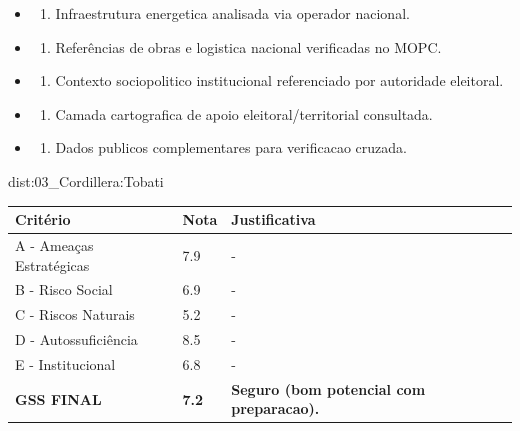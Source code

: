 {\begin{itemize}
\item
  \begin{enumerate}
  \def\labelenumi{\arabic{enumi})}
  \setcounter{enumi}{7}
  \tightlist
  \item
    Infraestrutura energetica analisada via operador nacional.
  \end{enumerate}
\item
  \begin{enumerate}
  \def\labelenumi{\arabic{enumi})}
  \setcounter{enumi}{8}
  \tightlist
  \item
    Referências de obras e logistica nacional verificadas no MOPC.
  \end{enumerate}
\item
  \begin{enumerate}
  \def\labelenumi{\arabic{enumi})}
  \setcounter{enumi}{9}
  \tightlist
  \item
    Contexto sociopolitico institucional referenciado por autoridade
    eleitoral.
  \end{enumerate}
\item
  \begin{enumerate}
  \def\labelenumi{\arabic{enumi})}
  \setcounter{enumi}{10}
  \tightlist
  \item
    Camada cartografica de apoio eleitoral/\allowbreak territorial consultada.
  \end{enumerate}
\item
  \begin{enumerate}
  \def\labelenumi{\arabic{enumi})}
  \setcounter{enumi}{11}
  \tightlist
  \item
    Dados publicos complementares para verificacao cruzada.
  \end{enumerate}
\end{itemize}}{dist:03_Cordillera:Tobati}
\begin{table}[ht!]
\small \begin{tabular}{p{3.0cm}p{0.8cm}p{6.0cm}} \toprule
\textbf{Critério} & \textbf{Nota} & \textbf{Justificativa} \\ \midrule
A - Ameaças Estratégicas & 7.9 & - \\
B - Risco Social & 6.9 & - \\
C - Riscos Naturais & 5.2 & - \\
D - Autossuficiência & 8.5 & - \\
E - Institucional & 6.8 & - \\
\midrule \textbf{GSS FINAL} & \textbf{7.2} & \textbf{Seguro (bom potencial com preparacao).} \\ \bottomrule \end{tabular}
\end{table}
